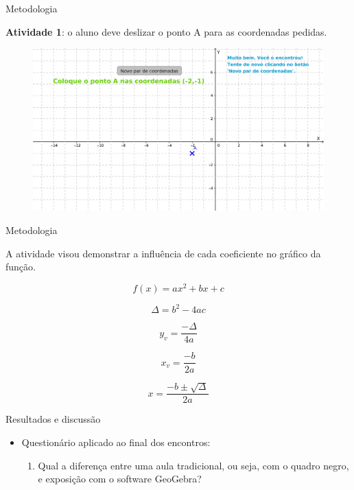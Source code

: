 \documentclass[svgnames,handout,aspectratio=169]{beamer}
\begin{document}
\begin{frame}{Metodologia}

\textbf{Atividade 1}: o aluno deve deslizar o ponto A para as coordenadas pedidas.

\begin{figure}
    \centering
    \includegraphics[width=1\linewidth]{atividade1.png} 
\end{figure}

\end{frame}




\begin{frame}{Metodologia}

A atividade visou demonstrar a influência de cada coeficiente no gráfico da função.

\begin{equation}
    f(x) = ax^2 + bx + c
\end{equation}

\begin{equation}
    \Delta = b^2-4ac
\end{equation}

\begin{equation}
    y_v = \frac{-\Delta}{4a}
\end{equation}

\begin{equation}
    x_v = \frac{-b}{2a}
\end{equation}

\begin{equation}
    x = \frac{-b \pm \sqrt{\Delta}}{2a}
\end{equation}
\end{frame}





\begin{frame}{Resultados e discussão}

\begin{itemize}
    \item Questionário aplicado ao final dos encontros:
\begin{enumerate}
    \item Qual a diferença entre uma aula tradicional, ou seja, com o quadro negro, e exposição com o software GeoGebra?
\end{enumerate}
\end{itemize}
\end{frame}
\end{document}
